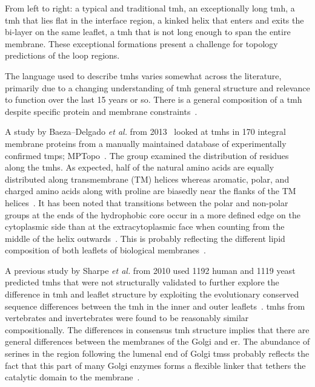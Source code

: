 From left to right: a typical and traditional \gls{tmh}, an exceptionally long \gls{tmh}, a \gls{tmh} that lies flat in the interface region, a kinked helix that enters and exits the bi-layer on the same leaflet, a \gls{tmh} that is not long enough to span the entire membrane.
These exceptional formations present a challenge for topology predictions of the loop regions.

The language used to describe \gls{tmh}s varies somewhat across the literature, primarily due to a changing understanding of \gls{tmh} general structure and relevance to function over the last 15 years or so.
There is a general composition of a \gls{tmh} despite specific protein and membrane constraints~\cite{Sharpe2010}.

A study by Baeza\---Delgado \textit{ et al.} from 2013~\cite{Baeza-Delgado2013} looked at \gls{tmh}s in 170 integral membrane proteins from a manually maintained database of experimentally confirmed \gls{tmp}s; MPTopo~\cite{Jayasinghe2001}.
The group examined the distribution of residues along the \gls{tmh}s.
As expected, half of the natural amino acids are equally distributed along transmembrane (TM) helices whereas aromatic, polar, and charged amino acids along with proline are biasedly near the flanks of the TM helices~\cite{Baeza-Delgado2013}.
It has been noted that transitions between the polar and non-polar groups at the ends of the hydrophobic core occur in a more defined edge on the cytoplasmic side than at the extracytoplasmic face when counting from the middle of the helix outwards~\cite{Baeza-Delgado2013}.
This is probably reflecting the different lipid composition of both leaflets of biological membranes~\cite{Baeza-Delgado2013}.

A previous study by Sharpe \textit{et al.} from 2010 used 1192 human and 1119 yeast predicted \gls{tmh}s that were not structurally validated to further explore the difference in \gls{tmh} and leaflet structure by exploiting the evolutionary conserved sequence differences between the \gls{tmh} in the inner and outer leaflets~\cite{Sharpe2010}.
\gls{tmh}s from vertebrates and invertebrates were found to be reasonably similar compositionally.
The differences in consensus \gls{tmh} structure implies that there are general differences between the membranes of the Golgi and \gls{er}.
The abundance of serines in the region following the lumenal end of Golgi \gls{tms}s probably reflects the fact that this part of many Golgi enzymes forms a flexible linker that tethers the catalytic domain to the membrane~\cite{Sharpe2010}.

